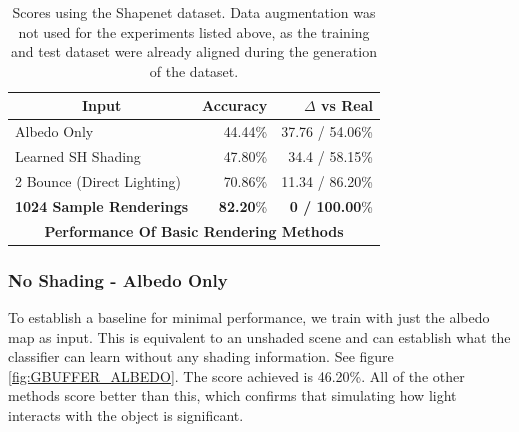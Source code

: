 \documentclass[10pt,twocolumn,letterpaper]{article}
\begin{document}
\begin{table}[]
\centering
\label{tblnonGI}
\begin{tabular}{|l|r|r|}
\hline
\multicolumn{1}{|c|}{\textbf{Input}}
& \multicolumn{1}{r|}{\textbf{Accuracy}}
& \multicolumn{1}{r|}{\textbf{$\Delta$ vs Real}} \\ \hline
Albedo Only 				&44.44\%	& 37.76 / 54.06\%	\\
Learned SH Shading			&47.80\%	& 34.4 / 58.15\%	\\
2 Bounce (Direct Lighting)	&70.86\%	& 11.34 / 86.20\%   \\
\textbf{1024 Sample Renderings}		& \textbf{82.20}\%	& \textbf{0 / 100.00}\%	\\ \hline
\multicolumn{3}{|c|}{\textbf{Performance Of Basic Rendering Methods}}	\\ \hline
\end{tabular}
\caption{Scores using the Shapenet dataset. Data augmentation was not used for the experiments listed above, as the training and test dataset were already aligned during the generation of the dataset.} 
\end{table}



\subsubsection{No Shading - Albedo Only}
To establish a baseline for minimal performance, we train with just the albedo map as input.  This is equivalent to an unshaded scene and can establish what the classifier can learn without any shading information. See figure \ref{fig:GBUFFER_ALBEDO}.  The score achieved is 46.20\%. All of the other methods score better than this, which confirms that simulating how light interacts with the object is significant.
\end{document}
